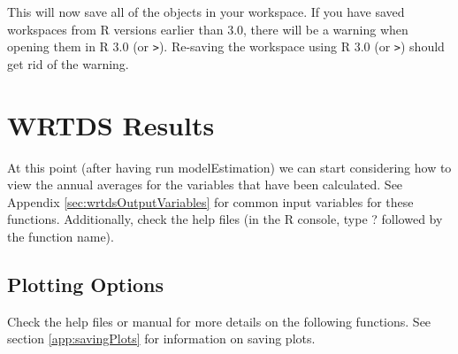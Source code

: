 \documentclass[a4paper,11pt]{article}\usepackage{graphicx, color}
\begin{document}
This will now save all of the objects in your workspace. If you have saved workspaces from R versions earlier than 3.0, there will be a warning when opening them in R 3.0 (or \verb|>|). Re-saving the workspace using R 3.0 (or \verb|>|) should get rid of the warning.


\FloatBarrier

\section{WRTDS Results}
\label{sec:wrtdsResults}
At this point (after having run modelEstimation) we can start considering how to view the annual averages for the variables that have been calculated.  See Appendix \ref{sec:wrtdsOutputVariables} for common input variables for these functions. Additionally, check the help files (in the R console, type ? followed by the function name).

\subsection{Plotting Options}
\label{sec:wrtdsPlotting}

\FloatBarrier

Check the help files or manual for more details on the following functions.  See section \ref{app:savingPlots} for information on saving plots.
\end{document}
